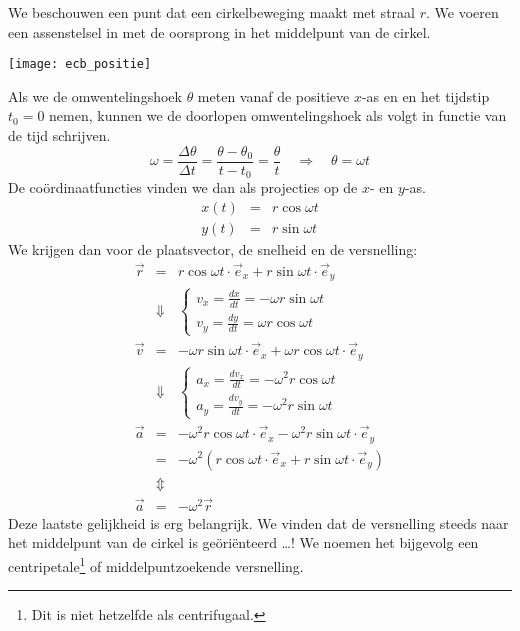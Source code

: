 \documentclass{ximera}
\begin{document}
We beschouwen een punt dat een cirkelbeweging maakt met straal $r$. We voeren een assenstelsel in met de oorsprong in het middelpunt van de cirkel.
\begin{image}
	\texttt{[image: ecb\_positie]}
\end{image}
Als we de omwentelingshoek $\theta$ meten vanaf de positieve $x$-as en en het tijdstip $t_0=0$ nemen, kunnen we de doorlopen omwentelingshoek als volgt in functie van de tijd schrijven.
\begin{equation*}
	\omega=\frac{\Delta\theta}{\Delta t}=\frac{\theta-\theta_0}{t-t_0}=\frac{\theta}{t}\quad\Rightarrow\quad\theta=\omega t
\end{equation*}
De co\"ordinaatfuncties vinden we dan als projecties op de $x$- en $y$-as. 
\begin{eqnarray*}
	x(t)&=&r\cos\omega t\\
	y(t)&=&r\sin\omega t
\end{eqnarray*}
We krijgen dan voor de plaatsvector, de snelheid en de versnelling:
\begin{eqnarray}
	\vec{r}&=&r\cos\omega t\cdot\vec{e}_x+r\sin\omega t\cdot\vec{e}_y\nonumber\\
	&\Downarrow&
	\left\{
		\begin{array}{l}
			v_x=\frac{dx}{dt}=-\omega r\sin\omega t\\
			v_y=\frac{dy}{dt}=\omega r\cos\omega t
		\end{array}
	\right.\nonumber\\
	\vec{v}&=&-\omega r\sin\omega t\cdot\vec{e}_x+\omega r\cos\omega t\cdot\vec{e}_y\nonumber\\
	&\Downarrow&
	\left\{
		\begin{array}{l}
			a_x=\frac{dv_x}{dt}=-\omega^2 r\cos\omega t\\
			a_y=\frac{dv_y}{dt}=-\omega^2 r\sin\omega t
		\end{array}
	\right.\nonumber\\
	\vec{a}&=&-\omega^2 r\cos\omega t\cdot\vec{e}_x-\omega^2 r\sin\omega t\cdot\vec{e}_y\nonumber\\
	&=&-\omega^2(r\cos\omega t\cdot\vec{e}_x+r\sin\omega t\cdot\vec{e}_y)\nonumber\\
	&\Updownarrow&\nonumber\\
	\vec{a}&=&-\omega^2\vec{r}\label{versnelling}
\end{eqnarray}
Deze laatste gelijkheid is erg belangrijk. We vinden dat de versnelling steeds naar het middelpunt van de cirkel is ge\"ori\"enteerd \ldots! We noemen het bijgevolg een centripetale\footnote{Dit is niet hetzelfde als centrifugaal.} of middelpuntzoekende versnelling.
\end{document}
